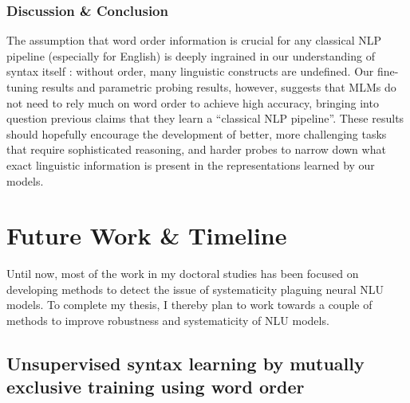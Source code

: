 \documentclass[12pt]{article}
\begin{document}
\subsubsection{Discussion \& Conclusion}

The assumption that word order information is crucial for any classical NLP pipeline (especially for English) is deeply ingrained in our understanding of syntax itself \citep{chomsky1957syntactic}: without order, many linguistic constructs are undefined. %
Our fine-tuning results and parametric probing results, however, suggests that MLMs do not need to rely much on word order to achieve high accuracy, bringing into question previous claims that they learn a ``classical NLP pipeline''. These results should hopefully encourage the development of better, more challenging tasks that require sophisticated reasoning, and harder probes to narrow down what exact linguistic information is present in the representations learned by our models.





\section{Future Work \& Timeline}

Until now, most of the work in my doctoral studies has been focused on developing methods to detect the issue of systematicity plaguing neural NLU models. To complete my thesis, I thereby plan to work towards a couple of methods to improve robustness and systematicity of NLU models.

\subsection{Unsupervised syntax learning by mutually exclusive training using word order}
\end{document}
